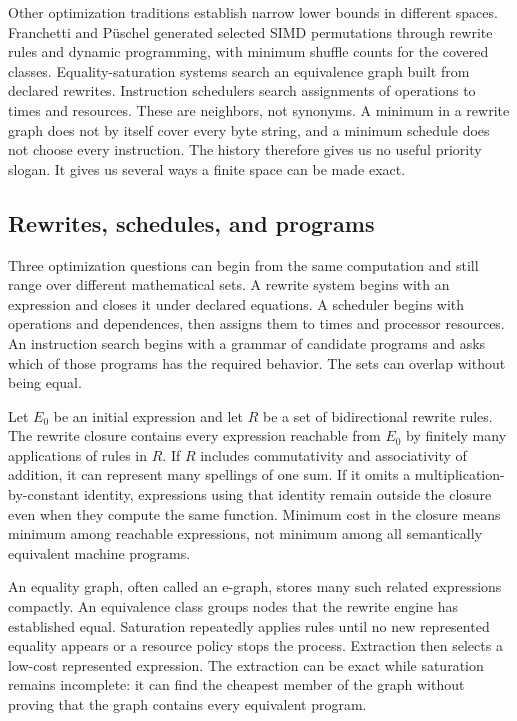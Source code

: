 Other optimization traditions establish narrow lower bounds in different
spaces. Franchetti and P\"{u}schel generated selected SIMD permutations through
rewrite rules and dynamic programming, with minimum shuffle counts for the
covered classes.\autocite{franchettipuschel2008} Equality-saturation systems
search an equivalence graph built from declared rewrites. Instruction
schedulers search assignments of operations to times and resources. These are
neighbors, not synonyms. A minimum in a rewrite graph does not by itself cover
every byte string, and a minimum schedule does not choose every instruction.
The history therefore gives us no useful priority slogan. It gives us several
ways a finite space can be made exact.

\subsection{Rewrites, schedules, and programs}

Three optimization questions can begin from the same computation and still
range over different mathematical sets. A rewrite system begins with an
expression and closes it under declared equations. A scheduler begins with
operations and dependences, then assigns them to times and processor
resources. An instruction search begins with a grammar of candidate programs
and asks which of those programs has the required behavior. The sets can
overlap without being equal.

Let \(E_0\) be an initial expression and let \(R\) be a set of bidirectional
rewrite rules. The rewrite closure contains every expression reachable from
\(E_0\) by finitely many applications of rules in \(R\). If \(R\) includes
commutativity and associativity of addition, it can represent many spellings
of one sum. If it omits a multiplication-by-constant identity, expressions
using that identity remain outside the closure even when they compute the same
function. Minimum cost in the closure means minimum among reachable
expressions, not minimum among all semantically equivalent machine programs.

An equality graph, often called an e-graph, stores many such related
expressions compactly. An equivalence class groups nodes that the rewrite
engine has established equal. Saturation repeatedly applies rules until no
new represented equality appears or a resource policy stops the process.
Extraction then selects a low-cost represented expression. The extraction
can be exact while saturation remains incomplete: it can find the cheapest
member of the graph without proving that the graph contains every equivalent
program.

